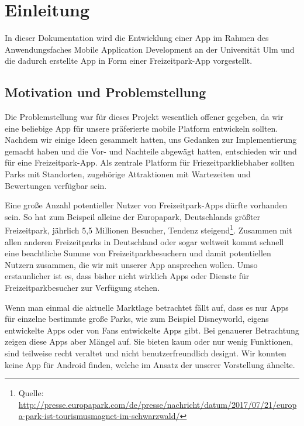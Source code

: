\chapter{Einleitung}
\label{cha:einleitung}

In dieser Dokumentation wird die Entwicklung einer App im Rahmen des Anwendungsfaches Mobile Application Development an der Universität Ulm und die dadurch erstellte App in Form einer Freizeitpark-App vorgestellt.

\section{Motivation und Problemstellung}
\label{sec:einleitung:problemstellung}

Die Problemstellung war für dieses Projekt wesentlich offener gegeben, da wir eine beliebige App für unsere präferierte mobile Platform entwickeln sollten. Nachdem wir einige Ideen gesammelt hatten, uns Gedanken zur Implementierung gemacht haben und die Vor- und Nachteile abgewägt hatten, entschieden wir und für eine Freizeitpark-App. Als zentrale Platform für Friezeitparkliebhaber sollten Parks mit Standorten, zugehörige Attraktionen mit Wartezeiten und Bewertungen verfügbar sein. 

Eine große Anzahl potentieller Nutzer von Freizeitpark-Apps dürfte vorhanden sein. So hat zum Beispeil alleine der Europapark, Deutschlands größter Freizeitpark, jährlich 5,5 Millionen Besucher, Tendenz steigend\footnote{Quelle:\url{ http://presse.europapark.com/de/presse/nachricht/datum/2017/07/21/europa-park-ist-tourismusmagnet-im-schwarzwald/}}. Zusammen mit allen anderen Freizeitparks in Deutschland oder sogar weltweit kommt schnell eine beachtliche Summe von Freizeitparkbesuchern und damit potentiellen Nutzern zusammen, die wir mit unserer App ansprechen wollen. Umso erstaunlicher ist es, dass bisher nicht wirklich Apps oder Dienste für Freizeitparkbesucher zur Verfügung stehen.

Wenn man einmal die aktuelle Marktlage betrachtet fällt auf, dass es nur Apps für einzelne bestimmte große Parks, wie zum Beispiel Disneyworld, eigens entwickelte Apps oder von Fans entwickelte Apps gibt. Bei genauerer Betrachtung zeigen diese Apps aber Mängel auf. Sie bieten kaum oder nur wenig Funktionen, sind teilweise recht veraltet und nicht benutzerfreundlich designt. Wir konnten keine App für Android finden, welche im Ansatz der unserer Vorstellung ähnelte.\\

